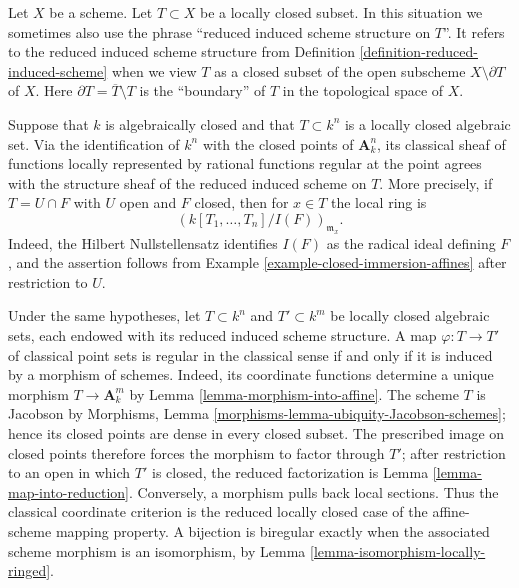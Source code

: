 \begin{remark}
\label{remark-reduced-induced-locally-closed}
\begin{reference}
\cite[Chapter II, \S 1, nos. 31--32 and 35, and \S 2, no. 37,
pp. 224--225 and 228--231]{FAC}
\end{reference}
Let $X$ be a scheme. Let $T \subset X$ be a locally closed subset.
In this situation we sometimes also use the phrase
``reduced induced scheme structure on $T$''. It refers
to the reduced induced scheme structure from
Definition \ref{definition-reduced-induced-scheme}
when we view $T$ as a closed subset of the open subscheme 
$X \setminus \partial T$ of $X$. Here
$\partial T = \overline{T} \setminus T$ is the ``boundary'' of $T$
in the topological space of $X$.

Suppose that $k$ is algebraically closed and that
$T \subset k^n$ is a locally closed algebraic set. Via the identification
of $k^n$ with the closed points of $\mathbf{A}^n_k$, its classical sheaf of
functions locally represented by rational functions regular at the point
agrees with the structure sheaf of the reduced induced scheme on $T$.
More precisely, if $T = U \cap F$ with $U$ open and $F$ closed, then for
$x \in T$ the local ring is
$$
\left(k[T_1, \ldots, T_n]/I(F)\right)_{\mathfrak m_x}.
$$
Indeed, the Hilbert Nullstellensatz identifies $I(F)$ as the radical ideal
defining $F$, and the assertion follows from
Example \ref{example-closed-immersion-affines} after restriction to $U$.

Under the same hypotheses, let $T \subset k^n$ and $T' \subset k^m$ be
locally closed algebraic sets, each endowed with its reduced induced scheme
structure. A map $\varphi : T \to T'$ of classical point sets is regular in
the classical sense if and only if it is induced by a morphism of schemes.
Indeed, its coordinate functions determine a unique morphism
$T \to \mathbf{A}^m_k$ by Lemma \ref{lemma-morphism-into-affine}.
The scheme $T$ is Jacobson by
Morphisms, Lemma \ref{morphisms-lemma-ubiquity-Jacobson-schemes}; hence its
closed points are dense in every closed subset. The prescribed image on
closed points therefore forces the morphism to factor through $T'$; after
restriction to an open in which $T'$ is closed, the reduced factorization is
Lemma \ref{lemma-map-into-reduction}. Conversely, a morphism pulls back local
sections. Thus the classical coordinate criterion is the reduced locally
closed case of the affine-scheme mapping property. A bijection is biregular
exactly when the associated scheme morphism is an isomorphism, by
Lemma \ref{lemma-isomorphism-locally-ringed}.


\end{remark}
